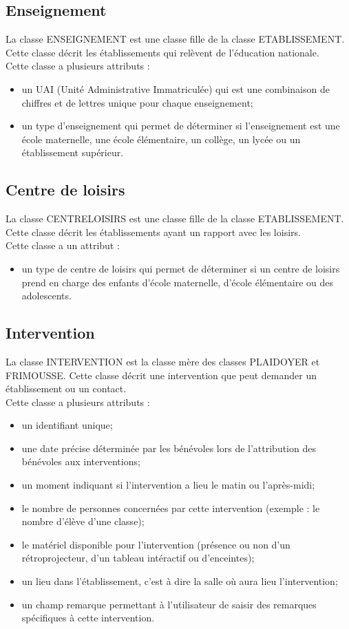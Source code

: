 \documentclass[asi, sansVersion]{picInsa}
\begin{document}
\subsection*{Enseignement}
La classe ENSEIGNEMENT est une classe fille de la classe ETABLISSEMENT. Cette classe décrit les établissements qui relèvent de l'éducation nationale. \\
Cette classe a plusieurs attributs : 
\begin{itemize}
\item un UAI (Unité Administrative Immatriculée) qui est une combinaison de chiffres et de lettres unique pour chaque enseignement;
\item un type d'enseignement qui permet de déterminer si l'enseignement est une école maternelle, une école élémentaire, un collège, un lycée ou un établissement supérieur. 
\end{itemize} 


\subsection*{Centre de loisirs}
La classe CENTRELOISIRS est une classe fille de la classe ETABLISSEMENT. Cette classe décrit les établissements ayant un rapport avec les loisirs. \\
Cette classe a un attribut : 
\begin{itemize}
\item un type de centre de loisirs qui permet de déterminer si un centre de loisirs prend en charge des enfants d'école maternelle, d'école élémentaire ou des adolescents.
\end{itemize}  

\subsection*{Intervention}
La classe INTERVENTION est la classe mère des classes PLAIDOYER et FRIMOUSSE. Cette classe décrit une intervention que peut demander un établissement ou un contact. \\
Cette classe a plusieurs attributs :
\begin{itemize}
\item un identifiant unique;
\item une date précise déterminée par les bénévoles lors de l'attribution des bénévoles aux interventions;
\item un moment indiquant si l'intervention a lieu le matin ou l'après-midi;
\item le nombre de personnes concernées par cette intervention (exemple : le nombre d'élève d'une classe);
\item le matériel disponible pour l'intervention (présence ou non d'un rétroprojecteur, d'un tableau intéractif ou d'enceintes);
\item un lieu dans l'établissement, c'est à dire la salle où aura lieu l'intervention;
\item un champ remarque permettant à l'utilisateur de saisir des remarques spécifiques à cette intervention. 
\end{itemize}
\end{document}
